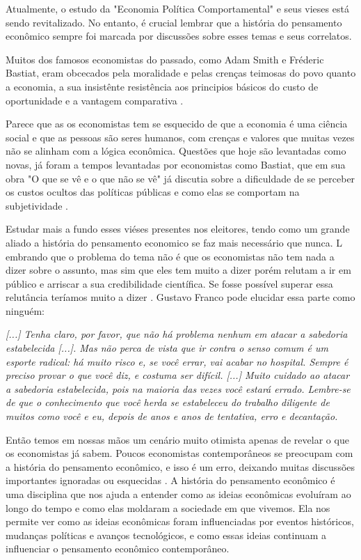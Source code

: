 Atualmente, o estudo da "Economia Política Comportamental" e seus vieses está sendo revitalizado. No entanto, é crucial lembrar que a história do pensamento econômico sempre foi marcada por discussões sobre esses temas e seus correlatos.

Muitos dos famosos economistas do passado, como Adam Smith e Fréderic Bastiat, eram obcecados pela moralidade e pelas crenças teimosas do povo quanto a economia, a sua insistênte resistência  aos principios básicos do custo de oportunidade e a vantagem comparativa \cite{hart2019bastiat,Wells2013,The_Myth_of_the_Rational_Voter}.

Parece que as os economistas tem se esquecido de que a economia é uma ciência social e que as pessoas são seres humanos, com crenças e valores que muitas vezes não se alinham com a lógica econômica. Questões que hoje são levantadas como novas, já foram a tempos levantadas por economistas como Bastiat, que em sua obra "O que se vê e o que não se vê" já discutia sobre a dificuldade de se perceber os custos ocultos das políticas públicas e como elas se comportam na subjetividade \cite{hart2019bastiat}.

Estudar mais a fundo esses viéses presentes nos eleitores, tendo como um grande aliado a história do pensamento economico se faz mais necessário que nunca. L embrando que o problema do tema não é que os economistas não tem nada a dizer sobre o assunto, mas sim que eles tem muito a dizer porém relutam a ir em público e arriscar a sua credibilidade científica. Se fosse possível superar essa relutância teríamos muito a dizer \cite{The_Myth_of_the_Rational_Voter}. Gustavo Franco pode elucidar essa parte como ninguém:

\begin{citacao}
    \textit{[...] Tenha claro, por favor, que não há problema nenhum em atacar a sabedoria estabelecida [...]. Mas não perca de vista que ir contra o senso comum é um esporte radical: há muito risco e, se você errar, vai acabar no hospital. Sempre é preciso provar o que você diz, e costuma ser difícil. [...] Muito cuidado ao atacar a sabedoria estabelecida, pois na maioria das vezes você estará errado. Lembre-se de que o conhecimento que você herda se estabeleceu do trabalho diligente de muitos como você e eu, depois de anos e anos de tentativa, erro e decantação. \newline
    }  \cite{franco2022cartas}
\end{citacao}

Então temos em nossas mãos um cenário muito otimista apenas de revelar o que os economistas já sabem. Poucos economistas contemporâneos se preocupam com a história do pensamento econômico, e isso é um erro, deixando muitas discussões importantes ignoradas ou esquecidas \cite{mark_history}. A história do pensamento econômico é uma disciplina que nos ajuda a entender como as ideias econômicas evoluíram ao longo do tempo e como elas moldaram a sociedade em que vivemos. Ela nos permite ver como as ideias econômicas foram influenciadas por eventos históricos, mudanças políticas e avanços tecnológicos, e como essas ideias continuam a influenciar o pensamento econômico contemporâneo.

